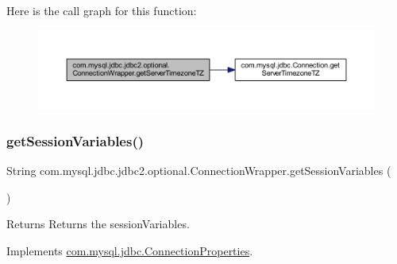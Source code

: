 Here is the call graph for this function\+:
\nopagebreak
\begin{figure}[H]
\begin{center}
\leavevmode
\includegraphics[width=350pt]{classcom_1_1mysql_1_1jdbc_1_1jdbc2_1_1optional_1_1_connection_wrapper_a2c40120ec4b0435a9e26955ee5d82c0d_cgraph}
\end{center}
\end{figure}
\mbox{\label{classcom_1_1mysql_1_1jdbc_1_1jdbc2_1_1optional_1_1_connection_wrapper_ac7004dec3742a421e0d6e275647eb34f}} 
\subsubsection{\texorpdfstring{get\+Session\+Variables()}{getSessionVariables()}}
{\footnotesize\ttfamily String com.\+mysql.\+jdbc.\+jdbc2.\+optional.\+Connection\+Wrapper.\+get\+Session\+Variables (\begin{DoxyParamCaption}{ }\end{DoxyParamCaption})}

\begin{DoxyReturn}{Returns}
Returns the session\+Variables. 
\end{DoxyReturn}


Implements \mbox{\hyperlink{interfacecom_1_1mysql_1_1jdbc_1_1_connection_properties_ad63fb7021671197a1bdf1d314420a224}{com.\+mysql.\+jdbc.\+Connection\+Properties}}.

